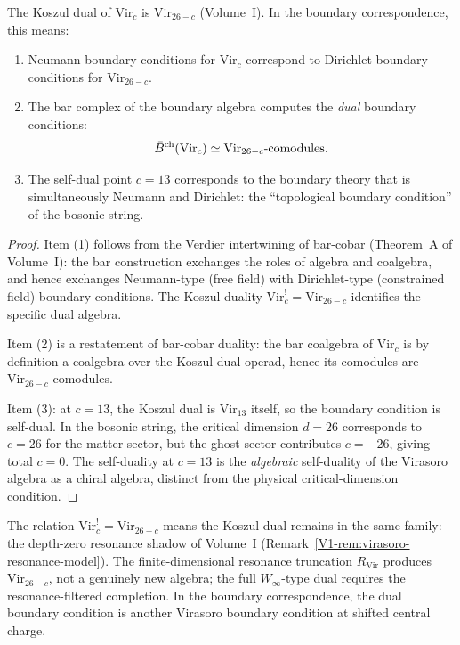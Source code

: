 \begin{proposition}
The Koszul dual of $\mathrm{Vir}_c$ is $\mathrm{Vir}_{26-c}$
(Volume~I). In the boundary correspondence, this means:
\begin{enumerate}
\item Neumann boundary conditions for $\mathrm{Vir}_c$ correspond to
 Dirichlet boundary conditions for $\mathrm{Vir}_{26-c}$.
\item The bar complex of the boundary algebra computes the
 \emph{dual} boundary conditions:
 \[
 \bar{B}^{\mathrm{ch}}(\mathrm{Vir}_c) \simeq
 \mathrm{Vir}_{26-c}\text{-comodules}.
 \]
\item The self-dual point $c = 13$ corresponds to the boundary
 theory that is simultaneously Neumann and Dirichlet: the
 ``topological boundary condition'' of the bosonic string.
\end{enumerate}
\end{proposition}

\begin{proof}
Item (1) follows from the Verdier intertwining of bar-cobar
(Theorem~A of Volume~I): the bar construction exchanges the roles of
algebra and coalgebra, and hence exchanges Neumann-type (free field)
with Dirichlet-type (constrained field) boundary conditions. The
Koszul duality $\mathrm{Vir}_c^! = \mathrm{Vir}_{26-c}$ identifies
the specific dual algebra.

Item (2) is a restatement of bar-cobar duality: the bar coalgebra of
$\mathrm{Vir}_c$ is by definition a coalgebra over the Koszul-dual
operad, hence its comodules are $\mathrm{Vir}_{26-c}$-comodules.

Item (3): at $c = 13$, the Koszul dual is $\mathrm{Vir}_{13}$ itself,
so the boundary condition is self-dual. In the bosonic string, the
critical dimension $d = 26$ corresponds to $c = 26$ for the matter
sector, but the ghost sector contributes $c = -26$, giving total
$c = 0$. The self-duality at $c = 13$ is the \emph{algebraic}
self-duality of the Virasoro algebra as a chiral algebra, distinct from
the physical critical-dimension condition.
\end{proof}

\begin{remark}
The relation $\mathrm{Vir}_c^! = \mathrm{Vir}_{26-c}$ means the
Koszul dual remains in the same family: the
depth-zero resonance shadow of Volume~I
(Remark~\ref*{V1-rem:virasoro-resonance-model}). The
finite-dimensional resonance truncation $R_{\mathrm{Vir}}$ produces
$\mathrm{Vir}_{26-c}$, not a genuinely new algebra; the full
$W_\infty$-type dual requires the resonance-filtered completion.
In the boundary correspondence, the dual boundary
condition is another Virasoro boundary condition at shifted central
charge.
\end{remark}

